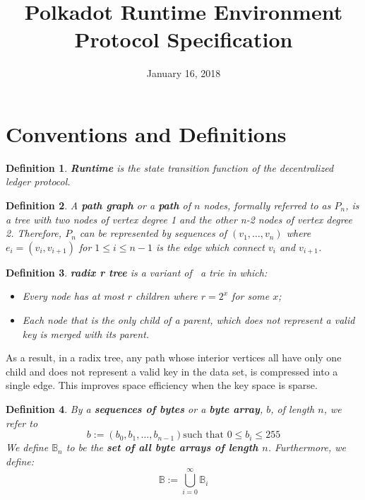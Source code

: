 \documentclass{article}
\newcommand{\assign}{:=}
\newcommand{\tmstrong}[1]{\textbf{#1}}
\newcommand{\tmtextbf}[1]{{\bfseries{#1}}}
\newtheorem{definition}{Definition}
\providecommand{\tmstrong}[1]{\tmtextbf{#1}}
\providecommand{\tmtextbf}[1]{\tmtextbf{#1}}
\newtheorem{definition}{Definition}
\begin{document}
\title{
  Polkadot Runtime Environment\\
  {\Large Protocol Specification}
}

\date{January 16, 2018}

\maketitle

\section{Conventions and Definitions}

\begin{definition}
  {\tmstrong{Runtime}} is the state transition function of the decentralized
  ledger protocol.
\end{definition}

\begin{definition}
  \label{def-path-graph}A {\tmstrong{path graph}} or a {\tmstrong{path}} of
  $n$ nodes, formally referred to as {\tmstrong{$P_n$}}, is a tree with two
  nodes of vertex degree 1 and the other n-2 nodes of vertex degree 2.
  Therefore, $P_n$ can be represented by sequences of $(v_1, \ldots, v_n)$
  where $e_i = (v_i, v_{i + 1})$ for $1 \leqslant i \leqslant n - 1$ is the
  edge which connect $v_i$ and $v_{i + 1}$.
\end{definition}

\begin{definition}
  \label{def-radix-tree}{\tmstrong{radix r tree}} is a variant of \ a trie in
  which:
  \begin{itemize}
    \item Every node has at most $r$ children where $r = 2^x$ for some $x$;
    
    \item Each node that is the only child of a parent, which does not
    represent a valid key is merged with its parent.
  \end{itemize}
\end{definition}

As a result, in a radix tree, any path whose interior vertices all have only
one child and does not represent a valid key in the data set, is compressed
into a single edge. This improves space efficiency when the key space is
sparse.

\begin{definition}
  By a {\tmstrong{sequences of bytes}} or a {\tmstrong{byte array}}, $b$, of
  length $n$, we refer to
  \[ b \assign (b_0, b_1, ..., b_{n - 1})  \text{such that } 0 \leqslant b_i
     \leqslant 255 \]
  We define $\mathbb{B}_n$ to be the {\tmstrong{set of all byte arrays of
  length $n$}}. Furthermore, we define:
  \[ \mathbb{B} \assign \bigcup^{\infty}_{i = 0} \mathbb{B}_i \]
\end{definition}
\end{document}
